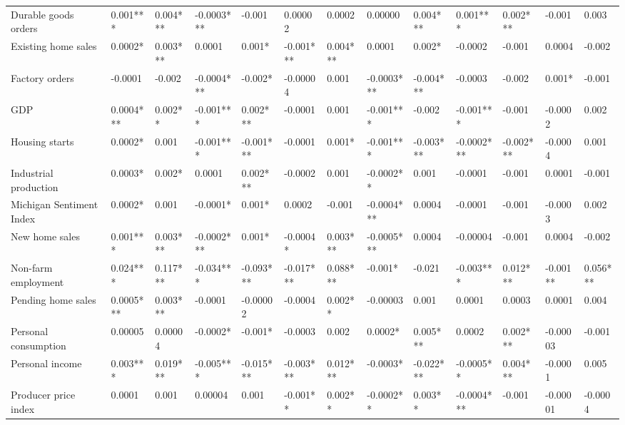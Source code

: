 \begin{landscape}
\begin{table}[]
{\begin{tabular}{lllllllllllll}
Durable goods orders     & 0.001***  & 0.004***  & -0.0003*** & -0.001    & 0.00002    & 0.0002   & 0.00000    & 0.004***  & 0.001***   & 0.002***  & -0.001   & 0.003     \\
Existing home sales      & 0.0002*   & 0.003***  & 0.0001     & 0.001*    & -0.001***  & 0.004*** & 0.0001     & 0.002*    & -0.0002    & -0.001    & 0.0004   & -0.002    \\
Factory orders           & -0.0001   & -0.002    & -0.0004*** & -0.002*   & -0.00004   & 0.001    & -0.0003*** & -0.004*** & -0.0003    & -0.002    & 0.001*   & -0.001    \\
GDP                      & 0.0004*** & 0.002**   & -0.001***  & 0.002***  & -0.0001    & 0.001    & -0.001***  & -0.002    & -0.001***  & -0.001    & -0.0002  & 0.002     \\
Housing starts           & 0.0002*   & 0.001     & -0.001***  & -0.001*** & -0.0001    & 0.001*   & -0.001***  & -0.003*** & -0.0002*** & -0.002*** & -0.0004  & 0.001     \\
Industrial production    & 0.0003*   & 0.002*    & 0.0001     & 0.002***  & -0.0002    & 0.001    & -0.0002**  & 0.001     & -0.0001    & -0.001    & 0.0001   & -0.001    \\
Michigan Sentiment Index & 0.0002*   & 0.001     & -0.0001*   & 0.001*    & 0.0002     & -0.001   & -0.0004*** & 0.0004    & -0.0001    & -0.001    & -0.0003  & 0.002     \\
New home sales           & 0.001***  & 0.003***  & -0.0002*** & 0.001*    & -0.0004*   & 0.003*** & -0.0005*** & 0.0004    & -0.00004   & -0.001    & 0.0004   & -0.002    \\
Non-farm employment      & 0.024***  & 0.117***  & -0.034***  & -0.093*** & -0.017***  & 0.088*** & -0.001*    & -0.021    & -0.003***  & 0.012***  & -0.001** & 0.056***  \\
Pending home sales       & 0.0005*** & 0.003***  & -0.0001    & -0.00002  & -0.0004    & 0.002**  & -0.00003   & 0.001     & 0.0001     & 0.0003    & 0.0001   & 0.004     \\
Personal consumption     & 0.00005   & 0.00004   & -0.0002*   & -0.001*   & -0.0003    & 0.002    & 0.0002*    & 0.005***  & 0.0002     & 0.002***  & -0.00003 & -0.001    \\
Personal income          & 0.003***  & 0.019***  & -0.005***  & -0.015*** & -0.003***  & 0.012*** & -0.0003*   & -0.022*** & -0.0005**  & 0.004***  & -0.0001  & 0.005     \\
Producer price index     & 0.0001    & 0.001     & 0.00004    & 0.001     & -0.001**   & 0.002**  & -0.0002**  & 0.003**   & -0.0004*** & -0.001    & -0.00001 & -0.0004   \\

\end{tabular}}
\end{table}
\end{landscape}
